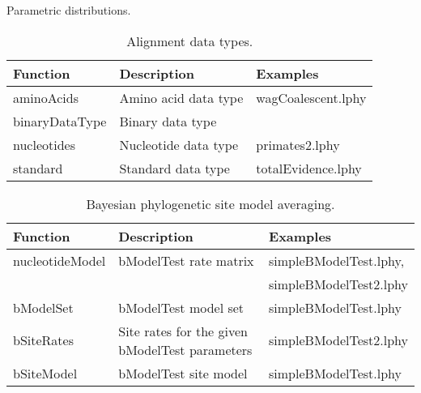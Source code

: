 \documentclass[12pt]{article} %
\begin{document}
\begin{table}
\label{tab:prior}
\caption{Parametric distributions.}
\end{table}


\begin{table}
\begin{center}
\small
\begin{tabular}{ l | l | l }
    \hline\hline
    Function & Description & Examples \\ 
    \hline\hline
    aminoAcids & Amino acid data type & wagCoalescent.lphy\\  
    binaryDataType & Binary data type & \\  
    nucleotides & Nucleotide data type & primates2.lphy\\  
    standard & Standard data type & totalEvidence.lphy\\  
    \hline
\end{tabular}
\label{tab:coalescent}
\caption{Alignment data types.}
\end{center}
\end{table}


\begin{table}
\small
\begin{tabular}{ l | l | l }
    \hline\hline
    Function & Description & Examples \\ 
    \hline\hline
    nucleotideModel & bModelTest\cite{bouckaert2017bmodeltestcomparison} rate matrix & simpleBModelTest.lphy, \\ & & simpleBModelTest2.lphy\\  
    bModelSet & bModelTest model set & simpleBModelTest.lphy\\  
    bSiteRates & Site rates for the given bModelTest parameters & simpleBModelTest2.lphy\\  
    bSiteModel & bModelTest site model & simpleBModelTest.lphy\\  
        \hline
\end{tabular}
\label{tab:coalescent}
\caption{Bayesian phylogenetic site model averaging.}
\end{table}

\clearpage




\end{document}
